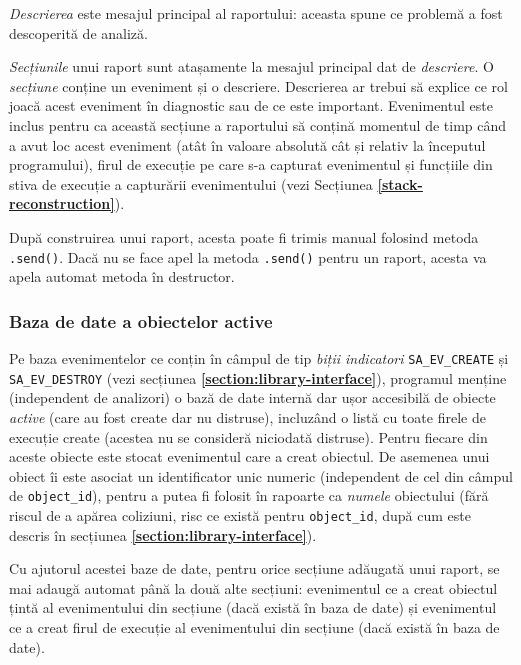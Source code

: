 \textit{Descrierea} este mesajul principal al raportului: aceasta spune
ce problemă a fost descoperită de analiză.

\textit{Secțiunile} unui raport sunt atașamente la mesajul principal dat
de \textit{descriere}. O \textit{secțiune} conține un eveniment și o
descriere. Descrierea ar trebui să explice ce rol joacă acest eveniment
în diagnostic sau de ce este important. Evenimentul este inclus pentru
ca această secțiune a raportului să conțină momentul de timp când a avut
loc acest eveniment (atât în valoare absolută cât și relativ la
începutul programului), firul de execuție pe care s-a capturat
evenimentul și funcțiile din stiva de execuție a capturării
evenimentului (vezi Secțiunea \textbf{\ref{stack-reconstruction}}).

După construirea unui raport, acesta poate fi trimis manual folosind
metoda \lstinline{.send()}. Dacă nu se face apel la metoda
\lstinline{.send()} pentru un raport, acesta va apela automat metoda în
destructor.

\subsubsection{Baza de date a obiectelor active}\label{obj-database}

Pe baza evenimentelor ce conțin în câmpul de tip
\textit{biții indicatori} \lstinline{SA_EV_CREATE} și
\lstinline{SA_EV_DESTROY} (vezi secțiunea
\textbf{\ref{section:library-interface}}), programul menține
(independent de analizori) o bază de date internă dar ușor accesibilă de
obiecte \textit{active} (care au fost create dar nu distruse), incluzând
o listă cu toate firele de execuție create (acestea nu se consideră
niciodată distruse). Pentru fiecare din aceste obiecte este stocat
evenimentul care a creat obiectul. De asemenea unui obiect îi este
asociat un identificator unic numeric (independent de cel din câmpul de
\lstinline{object_id}), pentru a putea fi folosit în rapoarte ca
\textit{numele} obiectului (fără riscul de a apărea coliziuni, risc ce
există pentru \lstinline{object_id}, după cum este descris în secțiunea
\textbf{\ref{section:library-interface}}).

Cu ajutorul acestei baze de date, pentru orice secțiune adăugată unui
raport, se mai adaugă automat până la două alte secțiuni: evenimentul ce
a creat obiectul țintă al evenimentului din secțiune (dacă există în
baza de date) și evenimentul ce a creat firul de execuție al
evenimentului din secțiune (dacă există în baza de date).

